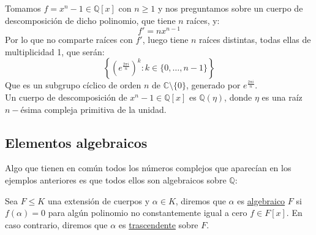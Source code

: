 \begin{ejemplo}
    Tomamos $f=x^n-1\in \mathbb{Q}[x]$ con $n\geq 1$ y nos preguntamos sobre un cuerpo de descomposición de dicho polinomio, que tiene $n$ raíces, y:
    \begin{equation*}
        f' = nx^{n-1}
    \end{equation*}
    Por lo que no comparte raíces con $f'$, luego tiene $n$ raíces distintas, todas ellas de multiplicidad 1, que serán:
    \begin{equation*}
        \left\{{\left(e^{\frac{2\pi i}{n}}\right)}^{k}:k\in \{0,\ldots,n-1\}\right\}
    \end{equation*}
    Que es un subgrupo cíclico de orden $n$ de $\mathbb{C}\setminus\{0\}$, generado por $e^{\frac{2\pi i}{n}}$.\\

    \noindent
    Un cuerpo de descomposición de $x^n-1\in \mathbb{Q}[x]$ es $\mathbb{Q}(\eta)$, donde $\eta$ es una raíz $n-$ésima compleja primitiva de la unidad.
\end{ejemplo}

\subsection{Elementos algebraicos}
\noindent
Algo que tienen en común todos los números complejos que aparecían en los ejemplos anteriores es que todos ellos son algebraicos sobre $\mathbb{Q}$:

\begin{definicion}
    Sea $F\leq K$ una extensión de cuerpos y $\alpha\in K$, diremos que $\alpha$ es \underline{algebraico}  $F$ si $f(\alpha)=0$ para algún polinomio no constantemente igual a cero $f\in F[x]$. En caso contrario, diremos que $\alpha$ es \underline{trascendente} sobre $F$.
\end{definicion}

